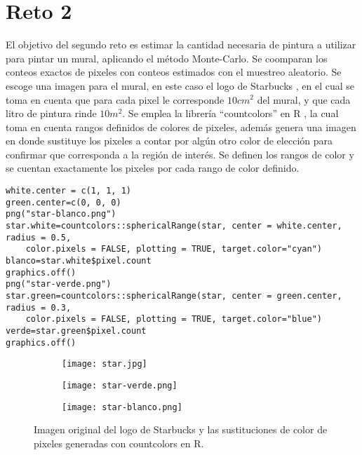 \documentclass[12pt]{amsart}
\begin{document}
\section{Reto 2}
El objetivo del segundo reto es estimar la cantidad necesaria de pintura a utilizar para pintar un mural, aplicando el método Monte-Carlo. Se coomparan los conteos exactos de pixeles con conteos estimados con el muestreo aleatorio.
Se escoge una imagen para el mural, en este caso el logo de Starbucks \cite{star}, en el cual se toma en cuenta que para cada pixel le corresponde $10cm^{2}$ del mural, y que cada litro de pintura rinde $10m^{2}$. Se emplea la librería ``countcolors'' en R \cite{R}, la cual toma en cuenta rangos definidos de colores de pixeles, además genera una imagen en donde sustituye los pixeles a contar por algún otro color de elección para confirmar que corresponda a la región de interés. Se definen los rangos de color y se cuentan exactamente los pixeles por cada rango de color definido.
\renewcommand{\listingscaption}{Código}
\begin{listing}[H]
  \begin{verbatim}
white.center = c(1, 1, 1)
green.center=c(0, 0, 0)
png("star-blanco.png")
star.white=countcolors::sphericalRange(star, center = white.center, radius = 0.5,
    color.pixels = FALSE, plotting = TRUE, target.color="cyan")  
blanco=star.white$pixel.count
graphics.off()
png("star-verde.png")
star.green=countcolors::sphericalRange(star, center = green.center, radius = 0.3, 
    color.pixels = FALSE, plotting = TRUE, target.color="blue")  
verde=star.green$pixel.count
graphics.off()
  \end{verbatim}
  \label{codigo6}
\end{listing}
\begin{figure} [h!]
\centering
\begin{subfigure}[b]{0.27\linewidth}
\texttt{[image: star.jpg]}
\caption{}
\label{5a}
\end{subfigure}
\begin{subfigure}[b]{0.3\linewidth}
\texttt{[image: star-verde.png]}
\caption{}
\label{5b}
\end{subfigure}
\begin{subfigure}[b]{0.3\linewidth}
\texttt{[image: star-blanco.png]}
\caption{}
\label{5c}
\end{subfigure}
\caption{Imagen original del logo de Starbucks y las sustituciones de color de pixeles generadas con countcolors en R.}
\label{fig5}
\end{figure}
\end{document}

